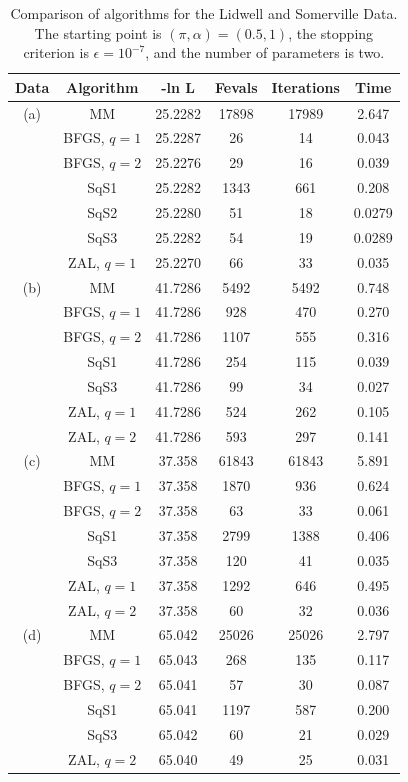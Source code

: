 \documentclass[12pt]{article}
\begin{document}
\begin{table}[h!]
\centering
\begin{tabular}{c | c c c c c} 
 \hline
 Data & Algorithm & -ln L & Fevals & Iterations & Time \\ [0.5ex] 
 \hline
 (a) & MM & 25.2282 & 17898 & 17989 & 2.647 \\ 
   & BFGS, $q=1$ & 25.2287 & 26 & 14 & 0.043 \\
   & BFGS, $q=2$ & 25.2276 & 29 & 16 & 0.039\\
   & SqS1 & 25.2282 & 1343 & 661 & 0.208\\
   & SqS2 & 25.2280 & 51 & 18 & 0.0279\\
   & SqS3 & 25.2282 & 54 & 19 & 0.0289\\
   & ZAL, $q=1$ & 25.2270 & 66 & 33 & 0.035\\[1ex]
 (b) & MM & 41.7286 & 5492 & 5492 & 0.748 \\
   & BFGS, $q=1$ & 41.7286 & 928 & 470 & 0.270\\
   & BFGS, $q=2$ & 41.7286 & 1107 & 555 & 0.316\\
   & SqS1 & 41.7286 & 254 & 115 & 0.039\\
   & SqS3 & 41.7286 & 99 & 34 & 0.027\\
   & ZAL, $q=1$ & 41.7286 & 524 & 262 & 0.105\\
   & ZAL, $q=2$ & 41.7286 & 593 & 297 & 0.141\\ [1ex]
  (c) & MM & 37.358 & 61843 &  61843 & 5.891\\
  & BFGS, $q=1$ & 37.358 & 1870 & 936 & 0.624\\
   & BFGS, $q=2$ & 37.358 & 63 & 33 & 0.061\\
   & SqS1 & 37.358 & 2799 & 1388 & 0.406 \\
   & SqS3 & 37.358 & 120 & 41 & 0.035 \\
   & ZAL, $q=1$ & 37.358 & 1292 & 646 & 0.495\\
   & ZAL, $q=2$ & 37.358 & 60 & 32 & 0.036 \\[1ex]
  (d) & MM & 65.042 & 25026 & 25026 & 2.797 \\
   & BFGS, $q=1$ & 65.043 & 268 & 135 & 0.117 \\
   & BFGS, $q=2$ & 65.041 & 57 & 30 &  0.087 \\
   & SqS1 & 65.041 & 1197 & 587 & 0.200 \\
   & SqS3 & 65.042 & 60 & 21 & 0.029 \\
   & ZAL, $q=2$ & 65.040 & 49 & 25 & 0.031 \\ [1ex]
 \hline
\end{tabular}
\caption{Comparison of algorithms for the Lidwell and Somerville
Data. The starting point is $(\pi,\alpha) = (0.5, 1)$, the stopping criterion
is $\epsilon = 10^{-7}$, and the number of parameters is two.}
\label{tab:beta_binom}
\end{table}
\end{document}
